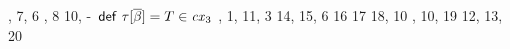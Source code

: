 \begin{bycase}
\begin{derivatioN}{5}
     {, 7, 6}
     {, 8}
     {10, \hyp\ $\mathsf{def}\ \tau[\overline{\beta}]=T\in\mathit{cx}_3$}
     {\Rtedef, 1, 11, 3}
\step{\tinst{\tnam}{\tsbslash{\typS}{\tvarIS}{\typIS}}=
      \tsbslash{\tinstO}{\tvarIS}{\typIS}}
     {}
     {14, }
     {15, 6}
     {16}
     {17}
     {18, 10}
\step{\tsbslash{\tsbslash{\typ}{\tvarS}{\typS}}{\tvarIS}{\typIS}=
      \tsbslash{\tsbslash{\typ}{\tvarIS}{\typIS}}
               {\tvarS}{\tsbslash{\typS}{\tvarIS}{\typIS}}}
     {, 10, 19}
     {12, 13, 20}
\end{derivatioN}


\end{bycase}
